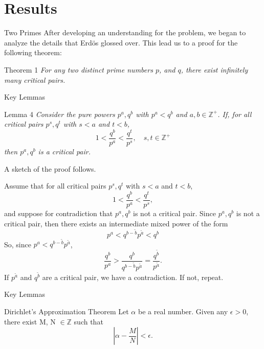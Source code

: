 \documentclass{beamer}
\newcommand{\Z}{{\mathbb Z}}
\begin{document}
\section{Results}
\begin{frame}{Two Primes}
After developing an understanding for the problem, we began to analyze the details that Erd\"os glossed over. This lead us to a proof for the following theorem:\\
\begin{block}{Theorem 1}
\textit{For any two distinct prime numbers $p$, and $q$, there exist infinitely many critical pairs.}
\end{block}

\end{frame}
\begin{frame}{Key Lemmas}
    \begin{block}{Lemma 4}
        \textit{Consider the pure powers $p^a, q^b$ with $p^a < q^b$ and $a,b \in \Z^+$. If, for all critical pairs $p^s,q^t$ with $s<a$ and $t<b$, $$1<\frac{q^b}{p^a}<\frac{q^t}{p^s}, \quad s,t \in \Z^+$$ then $p^a, q^b$ is a critical pair.}
    \end{block}
    A sketch of the proof follows.
\end{frame}

Assume that for all critical pairs $p^s,q^t$ with $s<a$ and $t<b$, 
$$1<\frac{q^b}{p^a}<\frac{q^t}{p^s},$$ and suppose for contradiction that $p^a, q^b$ is not a critical pair. Since $p^a, q^b$ is not a critical pair, then there exists an intermediate mixed power of the form
$$p^a < q^{b-\tilde{b}}p^{\tilde{a}} < q^b$$
So, since $p^a < q^{b-\tilde{b}}p^{\tilde{a}}$, 
\[\frac{q^b}{p^a}>\frac{q^b}{q^{b-\tilde{b}}p^{\tilde{a}}}=\frac{q^\tilde{b}}{p^\tilde{a}}.\]
If $p^{\tilde{a}}$ and $q^{\tilde{b}}$ are a critical pair, we have a contradiction. If not, repeat.

\begin{frame}{Key Lemmas} 
    \begin{block}{Dirichlet's Approximation Theorem}
    Let $\alpha$ be a real number. Given any $\epsilon>0$, there exist M, N $\in \Z$ such that
    $$ \left| \alpha - \frac{M}{N}\right|<\epsilon.$$
    \end{block}
\end{frame}
\end{document}
